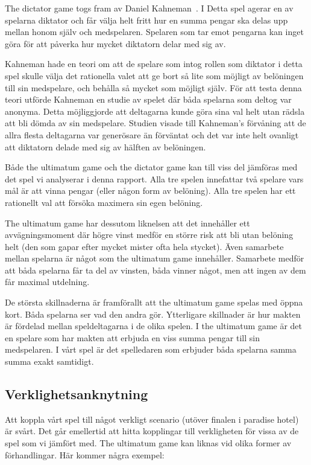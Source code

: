 The dictator game togs fram av Daniel Kahneman~\cite{Kahneman:1986}. I Detta spel agerar en av spelarna diktator och får välja helt fritt hur en summa pengar ska delas upp mellan honom själv och medspelaren. Spelaren som tar emot pengarna kan inget göra för att påverka hur mycket diktatorn delar med sig av. 

Kahneman hade en teori om att de spelare som intog rollen som diktator i detta spel skulle välja det rationella valet att ge bort så lite som möjligt av belöningen till sin medspelare, och behålla så mycket som möjligt själv. För att testa denna teori utförde Kahneman en studie av spelet där båda  spelarna som deltog var anonyma. Detta möjliggjorde att deltagarna kunde göra sina val helt utan rädsla att bli dömda av sin medspelare. Studien visade till Kahneman’s förvåning att de allra flesta deltagarna var generösare än förväntat och det var inte helt ovanligt att diktatorn delade med sig av hälften av belöningen.

Både the ultimatum game och the dictator game kan till viss del jämföras med det spel vi analyserar i denna rapport. Alla tre spelen innefattar två spelare vars mål är att vinna pengar (eller någon form av belöning). Alla tre spelen har ett rationellt val att försöka maximera sin egen belöning.

The ultimatum game har dessutom liknelsen att det innehåller ett avvägningsmoment där högre vinst medför en större risk att bli utan belöning helt (den som gapar efter mycket mister ofta hela stycket). Även samarbete mellan spelarna är något som the ultimatum game innehåller. Samarbete medför att båda spelarna får ta del av vinsten, båda vinner något, men att ingen av dem får maximal utdelning.

De största skillnaderna är framförallt att the ultimatum game spelas med öppna kort. Båda spelarna ser vad den andra gör. Ytterligare skillnader är hur makten är fördelad mellan speldeltagarna i de olika spelen. I the ultimatum game är det en spelare som har makten att erbjuda en viss summa pengar till sin medspelaren. I vårt spel är det spelledaren som erbjuder båda spelarna samma summa exakt samtidigt.

\subsection{Verklighetsanknytning}
Att koppla vårt spel till något verkligt scenario (utöver finalen i paradise hotel) är svårt. Det går emellertid att hitta kopplingar till verkligheten för vissa av de spel som vi jämfört med. The ultimatum game kan liknas vid olika former av förhandlingar. Här kommer några exempel:

